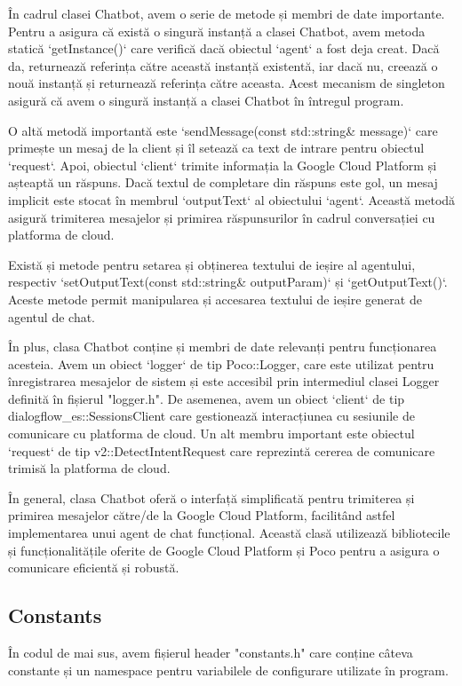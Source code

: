În cadrul clasei Chatbot, avem o serie de metode și membri de date importante. Pentru a asigura că există o singură instanță a clasei Chatbot, avem metoda statică `getInstance()` care verifică dacă obiectul `agent` a fost deja creat. Dacă da, returnează referința către această instanță existentă, iar dacă nu, creează o nouă instanță și returnează referința către aceasta. Acest mecanism de singleton asigură că avem o singură instanță a clasei Chatbot în întregul program.

O altă metodă importantă este `sendMessage(const std::string\& message)` care primește un mesaj de la client și îl setează ca text de intrare pentru obiectul `request`. Apoi, obiectul `client` trimite informația la Google Cloud Platform și așteaptă un răspuns. Dacă textul de completare din răspuns este gol, un mesaj implicit este stocat în membrul `outputText` al obiectului `agent`. Această metodă asigură trimiterea mesajelor și primirea răspunsurilor în cadrul conversației cu platforma de cloud.

Există și metode pentru setarea și obținerea textului de ieșire al agentului, respectiv `setOutputText(const std::string\& outputParam)` și `getOutputText()`. Aceste metode permit manipularea și accesarea textului de ieșire generat de agentul de chat.

În plus, clasa Chatbot conține și membri de date relevanți pentru funcționarea acesteia. Avem un obiect `logger` de tip Poco::Logger, care este utilizat pentru înregistrarea mesajelor de sistem și este accesibil prin intermediul clasei Logger definită în fișierul "logger.h". De asemenea, avem un obiect `client` de tip dialogflow\_es::SessionsClient care gestionează interacțiunea cu sesiunile de comunicare cu platforma de cloud. Un alt membru important este obiectul `request` de tip v2::DetectIntentRequest care reprezintă cererea de comunicare trimisă la platforma de cloud.

În general, clasa Chatbot oferă o interfață simplificată pentru trimiterea și primirea mesajelor către/de la Google Cloud Platform, facilitând astfel implementarea unui agent de chat funcțional. Această clasă utilizează bibliotecile și funcționalitățile oferite de Google Cloud Platform și Poco pentru a asigura o comunicare eficientă și robustă.

\subsection{Constants}

În codul de mai sus, avem fișierul header "constants.h" care conține câteva constante și un namespace pentru variabilele de configurare utilizate în program.


